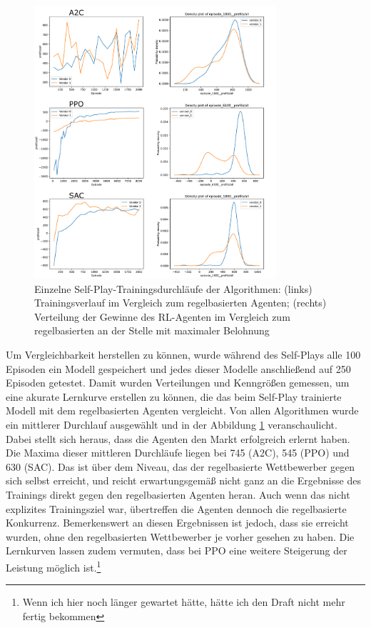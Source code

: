 \begin{figure}[htbp]
	\centering
	\includegraphics[width=0.8\textwidth]{main/self_play_detailed.pdf}
	\caption{
        Einzelne Self-Play-Trainingsdurchläufe der Algorithmen:
        (links) Trainingsverlauf im Vergleich zum regelbasierten Agenten;
        (rechts) Verteilung der Gewinne des RL-Agenten im Vergleich zum regelbasierten an der Stelle mit maximaler Belohnung
    }
	\label{grafic:SelfPlayDetails}
\end{figure}
Um Vergleichbarkeit herstellen zu können, wurde während des Self-Plays alle 100 Episoden ein Modell gespeichert und jedes dieser Modelle anschließend auf 250 Episoden getestet.
Damit wurden Verteilungen und Kenngrößen gemessen, um eine akurate Lernkurve erstellen zu können, die das beim Self-Play trainierte Modell mit dem regelbasierten Agenten vergleicht.
Von allen Algorithmen wurde ein mittlerer Durchlauf ausgewählt und in der Abbildung \ref{grafic:SelfPlayDetails} veranschaulicht.
Dabei stellt sich heraus, dass die Agenten den Markt erfolgreich erlernt haben.
Die Maxima dieser mittleren Durchläufe liegen bei 745 (A2C), 545 (PPO) und 630 (SAC).
Das ist über dem Niveau, das der regelbasierte Wettbewerber gegen sich selbst erreicht, und reicht erwartungsgemäß nicht ganz an die Ergebnisse des Trainings direkt gegen den regelbasierten Agenten heran.
Auch wenn das nicht explizites Trainingsziel war, übertreffen die Agenten dennoch die regelbasierte Konkurrenz.
Bemerkenswert an diesen Ergebnissen ist jedoch, dass sie erreicht wurden, ohne den regelbasierten Wettbewerber je vorher gesehen zu haben.
Die Lernkurven lassen zudem vermuten, dass bei PPO eine weitere Steigerung der Leistung möglich ist.\footnote{Wenn ich hier noch länger gewartet hätte, hätte ich den Draft nicht mehr fertig bekommen}

